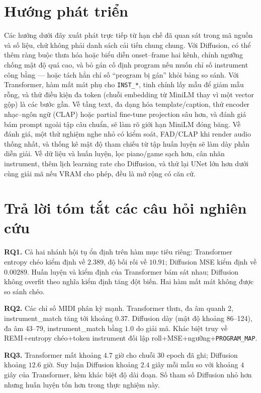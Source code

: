 \section{Hướng phát triển}
\label{sec:ch4-future}

Các hướng dưới đây xuất phát trực tiếp từ hạn chế đã quan sát trong mã nguồn và số liệu, chứ không phải danh sách cải tiến chung chung. Với Diffusion, có thể thêm ràng buộc thưa hóa hoặc biểu diễn onset--frame hai kênh, chỉnh ngưỡng chống mật độ quá cao, và bỏ gán cố định program nếu muốn chỉ số instrument công bằng --- hoặc tách hẳn chỉ số ``program bị gán'' khỏi bảng so sánh. Với Transformer, hàm mất mát phụ cho \texttt{INST\_*}, tinh chỉnh lấy mẫu để giảm mẫu rỗng, và thử điều kiện đa token (chuỗi embedding từ MiniLM thay vì một vector gộp) là các bước gần. Về tầng text, đa dạng hóa template/caption, thử encoder nhạc--ngôn ngữ (CLAP) hoặc partial fine-tune projection sâu hơn, và đánh giá bám prompt ngoài tập câu chuẩn, sẽ làm rõ giới hạn MiniLM đóng băng. Về đánh giá, một thử nghiệm nghe nhỏ có kiểm soát, FAD/CLAP khi render audio thống nhất, và thống kê mật độ tham chiếu từ tập huấn luyện sẽ làm dày phần diễn giải. Về dữ liệu và huấn luyện, lọc piano/game sạch hơn, cân nhãn instrument, thêm lịch learning rate cho Diffusion, và thử lại UNet lớn hơn dưới cùng giải mã nếu VRAM cho phép, đều là mở rộng có căn cứ.

\section{Trả lời tóm tắt các câu hỏi nghiên cứu}
\label{sec:ch4-rq-answers}

\textbf{RQ1.} Cả hai nhánh hội tụ ổn định trên hàm mục tiêu riêng: Transformer entropy chéo kiểm định về $2.389$, độ bối rối về $10.91$; Diffusion MSE kiểm định về $0.00289$. Huấn luyện và kiểm định của Transformer bám sát nhau; Diffusion không overfit theo nghĩa kiểm định tăng đột biến. Hai hàm mất mát không được so sánh chéo.

\textbf{RQ2.} Các chỉ số MIDI phân kỳ mạnh. Transformer thưa, đa âm quanh 2, instrument\_match tăng tới khoảng $0.37$. Diffusion dày (mật độ khoảng 86--124), đa âm 43--79, instrument\_match bằng $1.0$ do giải mã. Khác biệt truy về REMI+entropy chéo+token instrument đối lập roll+MSE+ngưỡng+\texttt{PROGRAM\_MAP}.

\textbf{RQ3.} Transformer mất khoảng $4.7$ giờ cho chuỗi 30 epoch đã ghi; Diffusion khoảng $12.6$ giờ. Suy luận Diffusion khoảng $2.4$ giây mỗi mẫu so với khoảng $4$ giây của Transformer, kèm khác biệt độ dài đoạn. Số tham số Diffusion nhỏ hơn nhưng huấn luyện tốn hơn trong thực nghiệm này.

